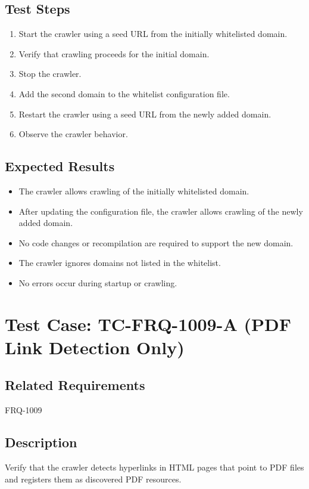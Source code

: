\documentclass{article}
\begin{document}
\subsection*{Test Steps}
\begin{enumerate}
  \item Start the crawler using a seed URL from the initially whitelisted domain.
  \item Verify that crawling proceeds for the initial domain.
  \item Stop the crawler.
  \item Add the second domain to the whitelist configuration file.
  \item Restart the crawler using a seed URL from the newly added domain.
  \item Observe the crawler behavior.
\end{enumerate}

\subsection*{Expected Results}
\begin{itemize}
  \item The crawler allows crawling of the initially whitelisted domain.
  \item After updating the configuration file, the crawler allows crawling of the newly added domain.
  \item No code changes or recompilation are required to support the new domain.
  \item The crawler ignores domains not listed in the whitelist.
  \item No errors occur during startup or crawling.
\end{itemize}



\section{Test Case: TC-FRQ-1009-A (PDF Link Detection Only)}

\subsection*{Related Requirements}
FRQ-1009

\subsection*{Description}
Verify that the crawler detects hyperlinks in HTML pages that point to PDF files
and registers them as discovered PDF resources.
\end{document}
